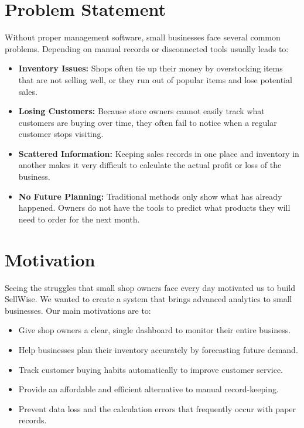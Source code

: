 \documentclass[12pt,a4paper]{report}
\begin{document}
\section{Problem Statement}
Without proper management software, small businesses face several common problems. Depending on manual records or disconnected tools usually leads to:
\begin{itemize}
    \item \textbf{Inventory Issues:} Shops often tie up their money by overstocking items that are not selling well, or they run out of popular items and lose potential sales.
    \item \textbf{Losing Customers:} Because store owners cannot easily track what customers are buying over time, they often fail to notice when a regular customer stops visiting.
    \item \textbf{Scattered Information:} Keeping sales records in one place and inventory in another makes it very difficult to calculate the actual profit or loss of the business.
    \item \textbf{No Future Planning:} Traditional methods only show what has already happened. Owners do not have the tools to predict what products they will need to order for the next month.
\end{itemize}

\section{Motivation}
Seeing the struggles that small shop owners face every day motivated us to build SellWise. We wanted to create a system that brings advanced analytics to small businesses. Our main motivations are to:
\begin{itemize}
    \item Give shop owners a clear, single dashboard to monitor their entire business.
    \item Help businesses plan their inventory accurately by forecasting future demand.
    \item Track customer buying habits automatically to improve customer service.
    \item Provide an affordable and efficient alternative to manual record-keeping.
    \item Prevent data loss and the calculation errors that frequently occur with paper records.
\end{itemize}
\end{document}
